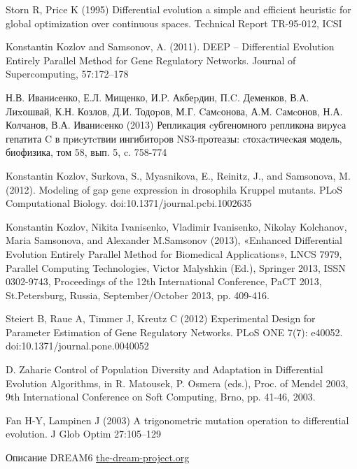 
\begin{thebibliography}{20} %

	Storn R, Price K (1995) 
	Differential evolution a simple and efficient heuristic for global optimization over continuous spaces. Technical Report TR-95-012, ICSI
	
	Konstantin Kozlov and Samsonov, A. (2011). 
	DEEP – Differential Evolution Entirely Parallel Method for Gene Regulatory Networks. Journal of Supercomputing, 57:172–178
	
	Н.В. Иваниcенко, Е.Л. Мищенко, И.P. Акбеpдин, П.C. Деменков, В.А. Лиxошвай, К.Н. Козлов, Д.И. Тодоpов, М.Г. Cамcонова, А.М. Cамcонов, Н.А. Колчанов, В.А. Иваниcенко (2013) 
	Репликация cубгеномного pепликона виpуcа гепатита C в пpиcутcтвии ингибитоpов NS3-пpотеазы: cтоxаcтичеcкая модель, биофизика, том 58, вып. 5, c. 758-774

	Konstantin Kozlov, Surkova, S., Myasnikova, E., Reinitz, J., and Samsonova, M. (2012). 
	Modeling of gap gene expression in drosophila Kruppel mutants. PLoS Computational Biology. doi:10.1371/journal.pcbi.1002635

	Konstantin Kozlov, Nikita Ivanisenko, Vladimir Ivanisenko, Nikolay Kolchanov, Maria Samsonova, and Alexander M.Samsonov (2013), 
	«Enhanced Differential Evolution Entirely Parallel Method for Biomedical Applications», LNCS 7979, Parallel Computing Technologies, Victor Malyshkin (Ed.), 
	Springer 2013, ISSN 0302-9743, Proceedings of the 12th International Conference, PaCT 2013, St.Petersburg, Russia, September/October 2013, pp. 409-416.

	Steiert B, Raue A, Timmer J, Kreutz C (2012) 
	Experimental Design for Parameter Estimation of Gene Regulatory Networks. PLoS ONE 7(7): e40052. doi:10.1371/journal.pone.0040052
	
	D. Zaharie
	Control of Population Diversity and Adaptation in Differential Evolution Algorithms, 
	in R. Matousek, P. Osmera (eds.), Proc. of Mendel 2003, 9th International Conference on Soft Computing, Brno, pp. 41-46, 2003.
	
	Fan H-Y, Lampinen J (2003) 
	A trigonometric mutation operation to differential evolution. J Glob Optim 27:105–129
	
	Описание DREAM6 \href{http://www.the-dream-project.org/challenges/dream6-estimation-model-parameters-challenge}{the-dream-project.org}

\end{thebibliography}
